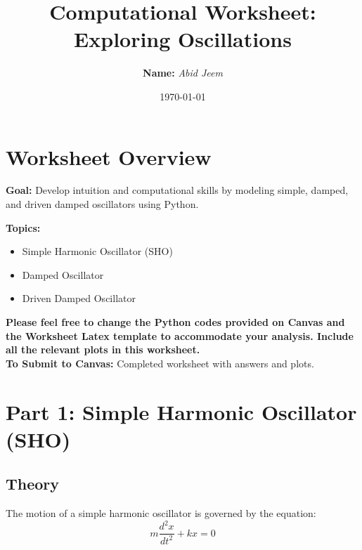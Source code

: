 \documentclass {article}
\title{Computational Worksheet: Exploring Oscillations}
\author{\textbf{Name:} \textit{Abid Jeem}}
\date{\today}
\begin{document}
\maketitle

\section*{Worksheet Overview}
\textbf{Goal:} Develop intuition and computational skills by modeling simple, damped, and driven damped oscillators using Python.

\textbf{Topics:}
\begin{itemize}
    \item Simple Harmonic Oscillator (SHO)
    \item Damped Oscillator
    \item Driven Damped Oscillator
\end{itemize}

\textbf{Please feel free to change the Python codes provided on Canvas  and the Worksheet Latex template to accommodate your analysis. Include all the relevant  plots in this worksheet. }\\

\textbf{To Submit to Canvas:} Completed worksheet with answers and plots.

\section*{Part 1: Simple Harmonic Oscillator (SHO)}
\subsection*{Theory}
The motion of a simple harmonic oscillator is governed by the equation:
\[ m \frac{d^2x}{dt^2} + kx = 0 \]
\end{document}
